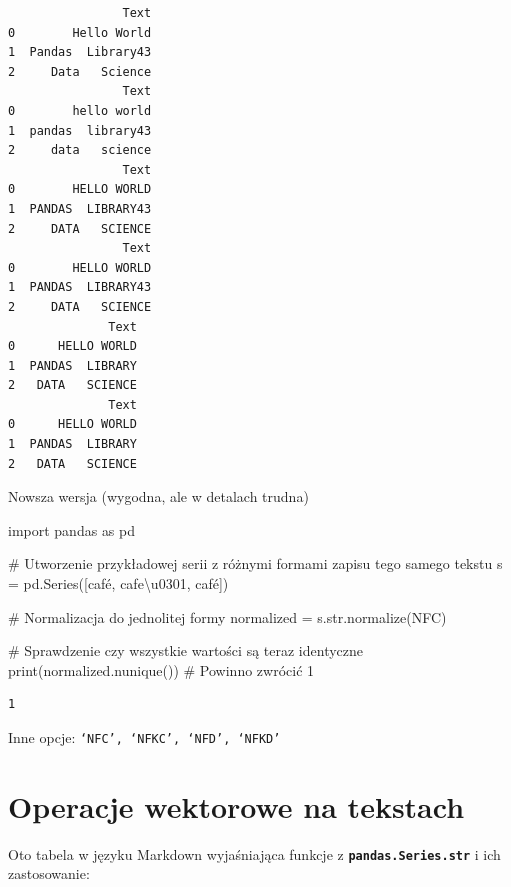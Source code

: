 \documentclass[
  polish,
  letterpaper,
  DIV=11,
  numbers=noendperiod]{scrreprt}
\newenvironment{Shaded}{\begin{snugshade}}{\end{snugshade}}
\newcommand{\BuiltInTok}[1]{\textcolor[rgb]{0.00,0.23,0.31}{#1}}
\newcommand{\CharTok}[1]{\textcolor[rgb]{0.13,0.47,0.30}{#1}}
\newcommand{\CommentTok}[1]{\textcolor[rgb]{0.37,0.37,0.37}{#1}}
\newcommand{\ImportTok}[1]{\textcolor[rgb]{0.00,0.46,0.62}{#1}}
\newcommand{\NormalTok}[1]{\textcolor[rgb]{0.00,0.23,0.31}{#1}}
\newcommand{\OperatorTok}[1]{\textcolor[rgb]{0.37,0.37,0.37}{#1}}
\newcommand{\StringTok}[1]{\textcolor[rgb]{0.13,0.47,0.30}{#1}}
\begin{document}
\begin{verbatim}
                Text
0        Hello World
1  Pandas  Library43
2     Data   Science
                Text
0        hello world
1  pandas  library43
2     data   science
                Text
0        HELLO WORLD
1  PANDAS  LIBRARY43
2     DATA   SCIENCE
                Text
0        HELLO WORLD
1  PANDAS  LIBRARY43
2     DATA   SCIENCE
              Text
0      HELLO WORLD
1  PANDAS  LIBRARY
2   DATA   SCIENCE
              Text
0      HELLO WORLD
1  PANDAS  LIBRARY
2   DATA   SCIENCE
\end{verbatim}

Nowsza wersja (wygodna, ale w detalach trudna)

\begin{Shaded}
\begin{Highlighting}[]
\ImportTok{import}\NormalTok{ pandas }\ImportTok{as}\NormalTok{ pd}

\CommentTok{\# Utworzenie przykładowej serii z różnymi formami zapisu tego samego tekstu}
\NormalTok{s }\OperatorTok{=}\NormalTok{ pd.Series([}\StringTok{\textquotesingle{}café\textquotesingle{}}\NormalTok{, }\StringTok{\textquotesingle{}cafe}\CharTok{\textbackslash{}u0301}\StringTok{\textquotesingle{}}\NormalTok{, }\StringTok{\textquotesingle{}café\textquotesingle{}}\NormalTok{])}

\CommentTok{\# Normalizacja do jednolitej formy}
\NormalTok{normalized }\OperatorTok{=}\NormalTok{ s.}\BuiltInTok{str}\NormalTok{.normalize(}\StringTok{\textquotesingle{}NFC\textquotesingle{}}\NormalTok{)}

\CommentTok{\# Sprawdzenie czy wszystkie wartości są teraz identyczne}
\BuiltInTok{print}\NormalTok{(normalized.nunique())  }\CommentTok{\# Powinno zwrócić 1}
\end{Highlighting}
\end{Shaded}

\begin{verbatim}
1
\end{verbatim}

Inne opcje: \texttt{‘NFC’,\ ‘NFKC’,\ ‘NFD’,\ ‘NFKD’}

\section{Operacje wektorowe na
tekstach}\label{operacje-wektorowe-na-tekstach}

Oto tabela w języku Markdown wyjaśniająca funkcje z
\textbf{\texttt{pandas.Series.str}} i ich zastosowanie:
\end{document}

